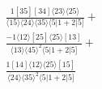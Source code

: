 \documentclass[varwidth, border=5pt]{standalone}
\begin{document}
\begin{my}
$\begin{gathered}
\scriptscriptstyle\frac{1[35][34]⟨23⟩⟨25⟩}{⟨15⟩⟨24⟩⟨35⟩⟨5|1+2|5]}+\\
\scriptscriptstyle\frac{-1⟨12⟩[25]⟨25⟩[13]}{⟨13⟩⟨45⟩^2⟨5|1+2|5]}+\\
\scriptscriptstyle\frac{1[14]⟨12⟩⟨25⟩[15]}{⟨24⟩⟨35⟩^2⟨5|1+2|5]}\phantom{+}
\end{gathered}$
\end{my}
\end{document}
